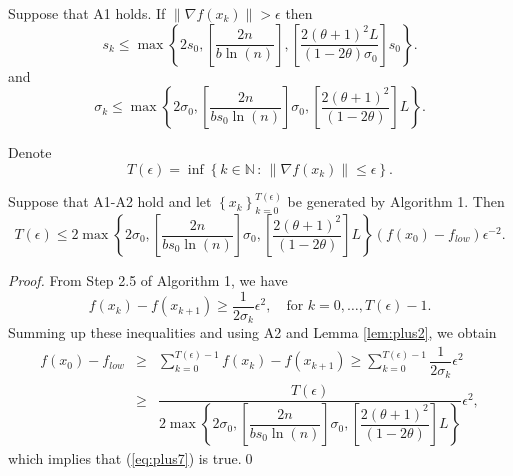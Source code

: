 \begin{lemma}
Suppose that A1 holds. If $\|\nabla f(x_{k})\|>\epsilon$ then
\begin{equation*}
s_{k}\leq\max\left\{2s_{0},\left[\dfrac{2n}{b\ln(n)}\right],\left[\dfrac{2(\theta+1)^{2}L}{(1-2\theta)\sigma_{0}}\right]s_{0}\right\}.
\end{equation*}
and
\begin{equation*}
\sigma_{k}\leq\max\left\{2\sigma_{0},\left[\dfrac{2n}{b s_{0}\ln(n)}\right]\sigma_{0},\left[\dfrac{2(\theta+1)^{2}}{(1-2\theta)}\right]L\right\}.
\end{equation*}
\label{lem:plus2}
\end{lemma}
Denote
\begin{equation}
T(\epsilon)=\inf\left\{k\in\mathbb{N}\,:\,\|\nabla f(x_{k})\|\leq\epsilon\right\}.
\label{eq:hitting}
\end{equation}

\begin{theorem}
\label{thm:plus1}
Suppose that A1-A2 hold and let $\left\{x_{k}\right\}_{k=0}^{T(\epsilon)}$ be generated by Algorithm 1. Then
\begin{equation}
T(\epsilon)\leq 2\max\left\{2\sigma_{0},\left[\dfrac{2n}{b s_{0}\ln(n)}\right]\sigma_{0},\left[\dfrac{2(\theta+1)^{2}}{(1-2\theta)}\right]L\right\}(f(x_{0})-f_{low})\epsilon^{-2}.
\label{eq:plus7}
\end{equation}
\end{theorem}

\begin{proof}
From Step 2.5 of Algorithm 1, we have
\begin{equation*}
f(x_{k})-f(x_{k+1})\geq\dfrac{1}{2\sigma_{k}}\epsilon^{2},\quad\text{for}\,\,k=0,\ldots,T(\epsilon)-1.
\end{equation*}
Summing up these inequalities and using A2 and Lemma \ref{lem:plus2}, we obtain
\begin{eqnarray*}
f(x_{0})-f_{low}&\geq &\sum_{k=0}^{T(\epsilon)-1} f(x_{k})-f(x_{k+1})\geq \sum_{k=0}^{T(\epsilon)-1}\dfrac{1}{2\sigma_{k}}\epsilon^{2}\\
                &\geq &\dfrac{T(\epsilon)}{2\max\left\{2\sigma_{0},\left[\dfrac{2n}{b s_{0}\ln(n)}\right]\sigma_{0},\left[\dfrac{2(\theta+1)^{2}}{(1-2\theta)}\right]L\right\}}\epsilon^{2},
\end{eqnarray*}
which implies that (\ref{eq:plus7}) is true.\qed
\end{proof}

